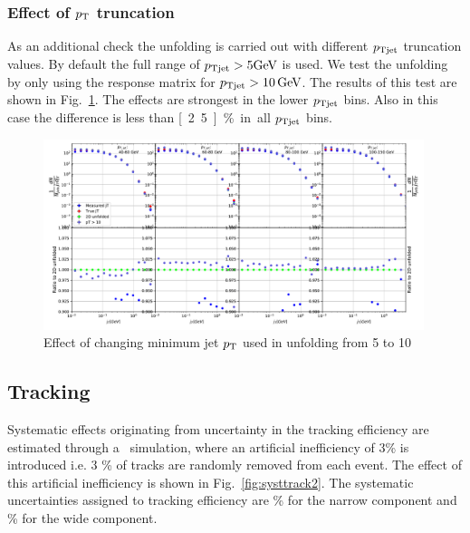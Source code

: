 \subsubsection{Effect of \texorpdfstring{$p_{\rm T}$}{pT} truncation}
\label{sec:truncation}
As an additional check the unfolding is carried out with different $p_{\rm Tjet}$ truncation values. By default the full range of $p_{\rm Tjet} > 5 \mathrm{GeV}\kern-0.05em$ is used. We test the unfolding by only using the response matrix for $\pt{jet} > \unit[10]{\gev}$. The results of this test are shown in Fig.~\ref{fig:truncation}. The effects are strongest in the lower $p_{\rm Tjet}$ bins. Also in this case the difference is less than \unit[2.5]{\%} in all $p_{\rm Tjet}$ bins.

\begin{figure}
\includegraphics[width=0.99\textwidth]{figures/systematics/PtCutComparison10.pdf}
\caption{Effect of changing minimum jet $p_{\rm T}$ used in unfolding from 5 to 10 \gev}
\label{fig:truncation}
\end{figure}

\subsection{Tracking}
Systematic effects originating from uncertainty in the tracking efficiency are estimated through a \pythia~simulation, where an artificial inefficiency of 3\% is introduced i.e. 3 \% of tracks are randomly removed from each event. The effect of this artificial inefficiency is shown in Fig.~\ref{fig:systtrack2}. The systematic uncertainties assigned to tracking efficiency are \unit[4]{\%} for the narrow component and \unit[5]{\%} for the wide component. 

